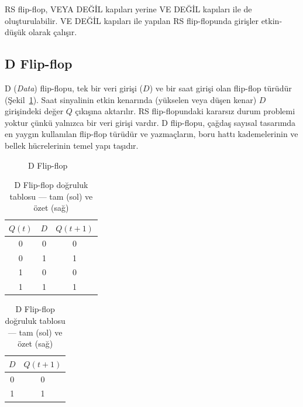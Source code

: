RS flip-flop, VEYA DEĞİL kapıları yerine VE DEĞİL kapıları ile de oluşturulabilir. VE DEĞİL kapıları ile yapılan RS flip-flopunda girişler etkin-düşük olarak çalışır.


\subsection{D Flip-flop}

D (\emph{Data}) flip-flopu, tek bir veri girişi ($D$) ve bir saat girişi olan flip-flop türüdür (Şekil~\ref{fig:B.25}). Saat sinyalinin etkin kenarında (yükselen veya düşen kenar) $D$ girişindeki değer $Q$ çıkışına aktarılır. RS flip-flopundaki kararsız durum problemi yoktur çünkü yalnızca bir veri girişi vardır. D flip-flopu, çağdaş sayısal tasarımda en yaygın kullanılan flip-flop türüdür ve yazmaçların, boru hattı kademelerinin ve bellek hücrelerinin temel yapı taşıdır.

\begin{figure}[H]
\centering
{}
\caption{D Flip-flop}
\label{fig:B.25}
\end{figure}

\begin{table}[H]
\centering
\caption{D Flip-flop doğruluk tablosu — tam (sol) ve özet (sağ)}
\label{tab:B.13}
\begin{tabular}{cc|c}
\toprule
$Q(t)$ & $D$ & $Q(t+1)$ \\
\midrule
0 & 0 & 0 \\
0 & 1 & 1 \\
1 & 0 & 0 \\
1 & 1 & 1 \\
\bottomrule
\end{tabular}
\hspace{1.5cm}
\begin{tabular}{c|c}
\toprule
$D$ & $Q(t+1)$ \\
\midrule
0 & 0 \\
1 & 1 \\
\bottomrule
\end{tabular}
\end{table}

